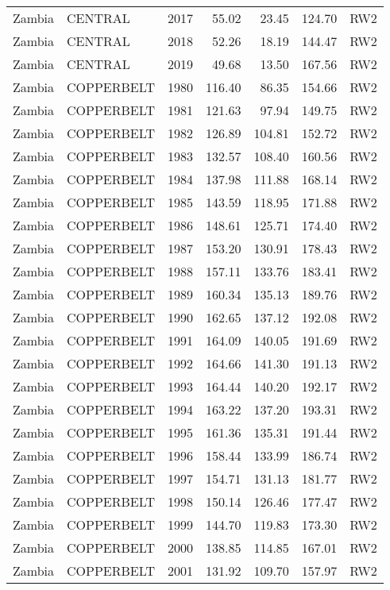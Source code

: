 \begin{longtable}{lllrrrl}
  Zambia & CENTRAL & 2017 & 55.02 & 23.45 & 124.70 & RW2 \\ 
  Zambia & CENTRAL & 2018 & 52.26 & 18.19 & 144.47 & RW2 \\ 
  Zambia & CENTRAL & 2019 & 49.68 & 13.50 & 167.56 & RW2 \\ 
  Zambia & COPPERBELT & 1980 & 116.40 & 86.35 & 154.66 & RW2 \\ 
  Zambia & COPPERBELT & 1981 & 121.63 & 97.94 & 149.75 & RW2 \\ 
  Zambia & COPPERBELT & 1982 & 126.89 & 104.81 & 152.72 & RW2 \\ 
  Zambia & COPPERBELT & 1983 & 132.57 & 108.40 & 160.56 & RW2 \\ 
  Zambia & COPPERBELT & 1984 & 137.98 & 111.88 & 168.14 & RW2 \\ 
  Zambia & COPPERBELT & 1985 & 143.59 & 118.95 & 171.88 & RW2 \\ 
  Zambia & COPPERBELT & 1986 & 148.61 & 125.71 & 174.40 & RW2 \\ 
  Zambia & COPPERBELT & 1987 & 153.20 & 130.91 & 178.43 & RW2 \\ 
  Zambia & COPPERBELT & 1988 & 157.11 & 133.76 & 183.41 & RW2 \\ 
  Zambia & COPPERBELT & 1989 & 160.34 & 135.13 & 189.76 & RW2 \\ 
  Zambia & COPPERBELT & 1990 & 162.65 & 137.12 & 192.08 & RW2 \\ 
  Zambia & COPPERBELT & 1991 & 164.09 & 140.05 & 191.69 & RW2 \\ 
  Zambia & COPPERBELT & 1992 & 164.66 & 141.30 & 191.13 & RW2 \\ 
  Zambia & COPPERBELT & 1993 & 164.44 & 140.20 & 192.17 & RW2 \\ 
  Zambia & COPPERBELT & 1994 & 163.22 & 137.20 & 193.31 & RW2 \\ 
  Zambia & COPPERBELT & 1995 & 161.36 & 135.31 & 191.44 & RW2 \\ 
  Zambia & COPPERBELT & 1996 & 158.44 & 133.99 & 186.74 & RW2 \\ 
  Zambia & COPPERBELT & 1997 & 154.71 & 131.13 & 181.77 & RW2 \\ 
  Zambia & COPPERBELT & 1998 & 150.14 & 126.46 & 177.47 & RW2 \\ 
  Zambia & COPPERBELT & 1999 & 144.70 & 119.83 & 173.30 & RW2 \\ 
  Zambia & COPPERBELT & 2000 & 138.85 & 114.85 & 167.01 & RW2 \\ 
  Zambia & COPPERBELT & 2001 & 131.92 & 109.70 & 157.97 & RW2 \\ 

\end{longtable}
